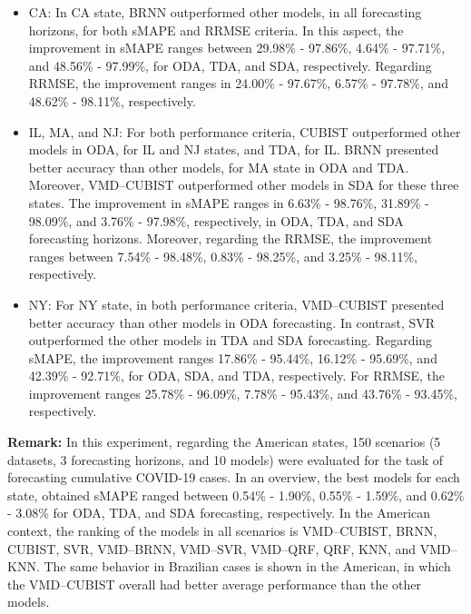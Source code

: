 \begin{itemize}
    \item \ac{CA}: In \ac{CA} state, \ac{BRNN} outperformed other models, in all forecasting horizons, for both \ac{sMAPE} and \ac{RRMSE} criteria. In this aspect, the improvement in \ac{sMAPE} ranges between 29.98\% - 97.86\%, 4.64\% - 97.71\%, and 48.56\% - 97.99\%, for \ac{ODA}, \ac{TDA}, and \ac{SDA}, respectively. Regarding \ac{RRMSE}, the improvement ranges in 24.00\% - 97.67\%, 6.57\% - 97.78\%, and 48.62\% - 98.11\%, respectively.
    
    \item \ac{IL}, \ac{MA}, and \ac{NJ}: For both performance criteria, \ac{CUBIST} outperformed other models in \ac{ODA}, for \ac{IL} and \ac{NJ} states, and \ac{TDA}, for \ac{IL}. \ac{BRNN} presented better accuracy than other models, for \ac{MA} state in \ac{ODA} and \ac{TDA}. Moreover, \ac{VMD}--\ac{CUBIST} outperformed other models in \ac{SDA} for these three states. The improvement in \ac{sMAPE} ranges in 6.63\% - 98.76\%, 31.89\% - 98.09\%, and 3.76\% - 97.98\%, respectively, in \ac{ODA}, \ac{TDA}, and \ac{SDA} forecasting horizons. Moreover, regarding the \ac{RRMSE}, the improvement ranges between 7.54\% - 98.48\%, 0.83\% - 98.25\%, and 3.25\% - 98.11\%, respectively.
    
    \item \ac{NY}: For \ac{NY} state, in both performance criteria, \ac{VMD}--\ac{CUBIST} presented better accuracy than other models in \ac{ODA} forecasting. In contrast, \ac{SVR} outperformed the other models in \ac{TDA} and \ac{SDA} forecasting. Regarding \ac{sMAPE}, the improvement ranges 17.86\% - 95.44\%, 16.12\% - 95.69\%, and 42.39\% - 92.71\%, for \ac{ODA}, \ac{SDA}, and \ac{TDA}, respectively. For \ac{RRMSE}, the improvement ranges 25.78\% - 96.09\%, 7.78\% - 95.43\%, and 43.76\% - 93.45\%, respectively.
\end{itemize}

\textbf{Remark:} In this experiment, regarding the American states, 150 scenarios (5 datasets, 3 forecasting horizons, and 10 models) were evaluated for the task of forecasting cumulative \ac{COVID-19} cases. In an overview, the best models for each state, obtained \ac{sMAPE} ranged between 0.54\% - 1.90\%, 0.55\% - 1.59\%, and 0.62\% - 3.08\% for \ac{ODA}, \ac{TDA}, and \ac{SDA} forecasting, respectively. In the American context, the ranking of the models in all scenarios is \ac{VMD}--\ac{CUBIST}, \ac{BRNN}, \ac{CUBIST}, \ac{SVR}, \ac{VMD}--\ac{BRNN}, \ac{VMD}--\ac{SVR}, \ac{VMD}--\ac{QRF}, \ac{QRF}, \ac{KNN}, and \ac{VMD}--\ac{KNN}. The same behavior in Brazilian cases is shown in the American, in which the \ac{VMD}--\ac{CUBIST} overall had better average performance than the other models.

